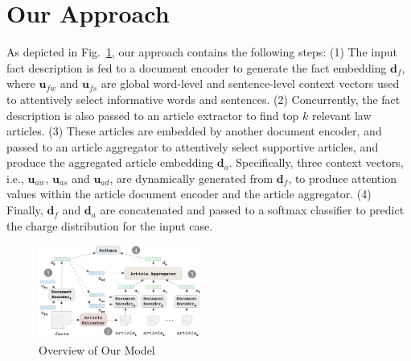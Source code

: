 


\section{Our Approach}
As depicted in Fig.~\ref{fig_model_framework}, our approach contains the following steps:
(1) The input fact description is fed to a document encoder to generate the fact embedding $\mathbf{d}_f$, where $\mathbf{u}_{fw}$ and $\mathbf{u}_{fs}$ are global word-level and sentence-level context vectors used to attentively select informative words and sentences.
(2) Concurrently, the fact description is also passed to an article extractor to find top $k$ relevant law articles. 
(3) These articles are embedded by another document encoder, and  passed to an article aggregator to attentively select supportive articles, and produce the aggregated article embedding $\mathbf{d}_a$. Specifically, three context vectors, i.e., $\mathbf{u}_{aw}$, $\mathbf{u}_{as}$ and $\mathbf{u}_{ad}$, are dynamically generated from $\mathbf{d}_f$, to 
produce attention values within
the article document encoder and the article aggregator. 
(4) Finally, $\mathbf{d}_f$ and $\mathbf{d}_a$ are concatenated and passed to a softmax classifier to predict the charge distribution for the input case.


\begin{figure}[t!]
\begin{center}
\includegraphics[width=0.48\textwidth]{figures/charge_pred_overview.png}	
\caption{Overview of Our Model}
\label{fig_model_framework}
\end{center}
\vspace{-1em}
\end{figure}

